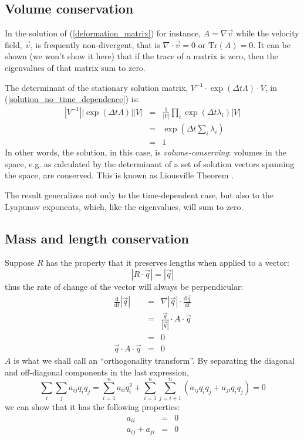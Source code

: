 \documentclass[11pt]{article}
\begin{document}
\subsection{Volume conservation}

In the solution of (\ref{deformation_matrix}) for instance, 
$A=\nabla \vec v$ while the velocity field, $\vec v$, is frequently non-divergent,
that is $\nabla \cdot \vec v=0$ or $\mathrm{Tr}(A)=0$.
It can be shown (we won't show it here) that 
if the trace of a matrix is zero, then the eigenvalues of that matrix
sum to zero.

The determinant of the stationary solution matrix,
$V^{-1}\cdot\exp(\Delta t\Lambda)\cdot V$, in (\ref{solution_no_time_dependence}) is:
\begin{eqnarray}
|V^{-1}||\exp(\Delta t\Lambda)||V| & = & \frac{1}{|V|}\prod_i \exp(\Delta t \lambda_i) |V| \\
& = & \exp\left(\Delta t \sum_i \lambda_i\right) \\
& = & 1
\end{eqnarray}
In other words, the solution, in this case, is {\it volume-conserving}:
volumes in the space, e.g. as calculated by the determinant of a set of 
solution vectors
spanning the space, are conserved.  
This is known as Liousville Theorem \cite{Thornton2003}.

The result generalizes not only to the time-dependent case, but
also to the Lyapunov exponents, which, like the eigenvalues, will sum to
zero.


\subsection{Mass and length conservation}

Suppose $R$ has the property that it preserves lengths when applied to
a vector:
\begin{equation}
|R\cdot \vec q| = |\vec q|
\label{length_preservation}
\end{equation}
thus the rate of change of the vector will always be perpendicular:
\begin{eqnarray}
\frac{\mathrm d}{\mathrm d t}|\vec q| & = & 
	\nabla |\vec q| \cdot \frac{\mathrm d \vec q}{\mathrm d t} \\
	&=& \frac{\vec q}{|\vec q|} \cdot A \cdot \vec q \\
	&=& 0 \\
	\vec q \cdot A \cdot \vec q & = & 0 
\end{eqnarray}
$A$ is what we shall call an ``orthogonality transform''.
By separating the diagonal and off-diagonal components in the last expression,
\begin{equation}
\sum_i \sum_j a_{ij} q_i q_j = \sum_{i=1}^n a_{ii}q_i^2 + \sum_{i=1}^n \sum_{j=i+1}^n (a_{ij} q_i q_j + a_{ji} q_i q_j) = 0
\end{equation}
we can show that it has the following
properties:
\begin{eqnarray}
a_{ii} & = & 0 \\
a_{ij}+a_{ji} & = & 0
\end{eqnarray}
\end{document}
